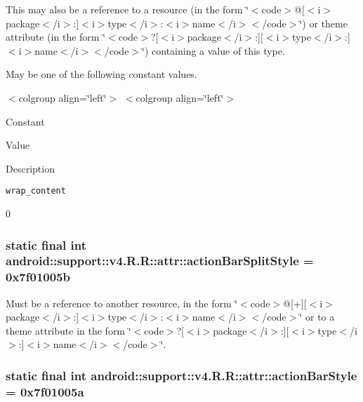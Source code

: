 This may also be a reference to a resource (in the form \char`\"{}$<$code$>$@\mbox{[}$<$i$>$package$<$/i$>$:\mbox{]}$<$i$>$type$<$/i$>$:$<$i$>$name$<$/i$>$$<$/code$>$\char`\"{}) or theme attribute (in the form \char`\"{}$<$code$>$?\mbox{[}$<$i$>$package$<$/i$>$:\mbox{]}\mbox{[}$<$i$>$type$<$/i$>$:\mbox{]}$<$i$>$name$<$/i$>$$<$/code$>$\char`\"{}) containing a value of this type. 

May be one of the following constant values. \begin{TabularC}{0}
\hline
\end{TabularC}
$<$colgroup align=\char`\"{}left\char`\"{}$>$ $<$colgroup align=\char`\"{}left\char`\"{}$>$ 

Constant

Value

Description 

{\tt wrap\_\-content}

0\hypertarget{classandroid_1_1support_1_1v4_1_1_r_1_1attr_c33fdae86b8b0a9a82a7558704fb242b}{
\subsubsection[{actionBarSplitStyle}]{\setlength{\rightskip}{0pt plus 5cm}static final int android::support::v4.R.R::attr::actionBarSplitStyle = 0x7f01005b}}
\label{classandroid_1_1support_1_1v4_1_1_r_1_1attr_c33fdae86b8b0a9a82a7558704fb242b}


Must be a reference to another resource, in the form \char`\"{}$<$code$>$@\mbox{[}+\mbox{]}\mbox{[}$<$i$>$package$<$/i$>$:\mbox{]}$<$i$>$type$<$/i$>$:$<$i$>$name$<$/i$>$$<$/code$>$\char`\"{} or to a theme attribute in the form \char`\"{}$<$code$>$?\mbox{[}$<$i$>$package$<$/i$>$:\mbox{]}\mbox{[}$<$i$>$type$<$/i$>$:\mbox{]}$<$i$>$name$<$/i$>$$<$/code$>$\char`\"{}. \hypertarget{classandroid_1_1support_1_1v4_1_1_r_1_1attr_6094ba3cd122fc85c532aa6f8c2b265b}{
\subsubsection[{actionBarStyle}]{\setlength{\rightskip}{0pt plus 5cm}static final int android::support::v4.R.R::attr::actionBarStyle = 0x7f01005a}}
\label{classandroid_1_1support_1_1v4_1_1_r_1_1attr_6094ba3cd122fc85c532aa6f8c2b265b}


